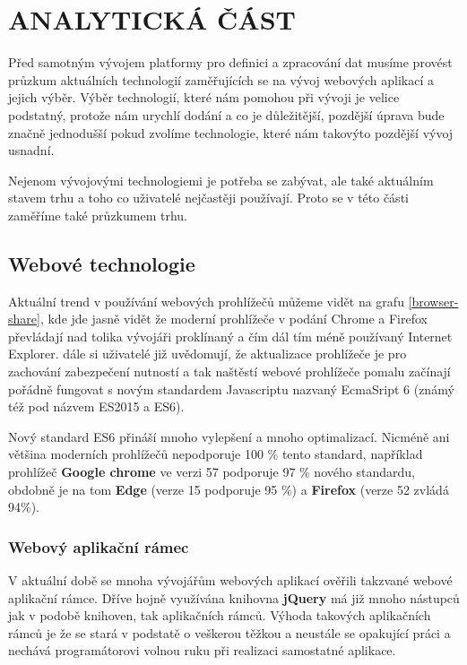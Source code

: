 \chapter{ANALYTICKÁ ČÁST} \label{analyza}
\par Před samotným vývojem platformy pro definici a zpracování dat musíme provést průzkum aktuálních technologií zaměřujících se na vývoj webových aplikací a jejich výběr. Výběr technologií, které nám pomohou při vývoji je velice podstatný, protože nám urychlí dodání a co je důležitější, pozdější úprava bude značně jednodušší pokud zvolíme technologie, které nám takovýto pozdější vývoj usnadní.

\par Nejenom vývojovými technologiemi je potřeba se zabývat, ale také aktuálním stavem trhu a toho co uživatelé nejčastěji používají. Proto se v této části zaměříme také průzkumem trhu.

\section{Webové technologie}
\par Aktuální trend v používání webových prohlížečů můžeme vidět na grafu \ref{browser-share}, kde jde jasně vidět že moderní prohlížeče v podání Chrome a Firefox převládají nad tolika vývojáři proklínaný a čím dál tím méně používaný Internet Explorer. dále si uživatelé již uvědomují, že aktualizace prohlížeče je pro zachování zabezpečení nutností a tak naštěstí webové prohlížeče pomalu začínají pořádně fungovat s novým standardem Javascriptu nazvaný EcmaSript 6 (známý též pod názvem ES2015 a ES6). \cite{es6}

\par Nový standard ES6 přináší mnoho vylepšení a mnoho optimalizací. Nicméně ani většina moderních prohlížečů nepodporuje 100 \% tento standard, například prohlížeč \textbf{Google chrome} ve verzi 57 podporuje 97 \% nového standardu, obdobně je na tom \textbf{Edge} (verze 15 podporuje 95 \%) a \textbf{Firefox} (verze 52 zvládá 94\%). \cite{es6-coverage}

\subsection{Webový aplikační rámec}
\par V aktuální době se mnoha vývojářům webových aplikací ověřili takzvané webové aplikační rámce. Dříve hojně využívána knihovna \textbf{jQuery} má již mnoho nástupců jak v podobě knihoven, tak aplikačních rámců. Výhoda takových aplikačních rámců je že se stará v podstatě o veškerou těžkou a neustále se opakující práci a nechává programátorovi volnou ruku při realizaci samostatné aplikace. \cite{framework}

